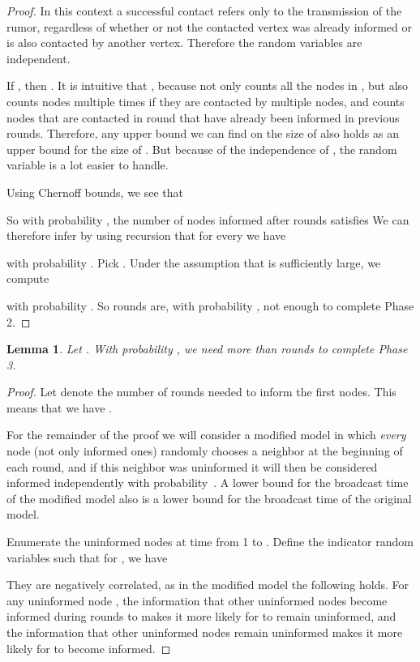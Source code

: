 \documentclass[12pt]{article}
\newtheorem{lemma}[theorem]{Lemma}
\begin{document}
{\begin{proof}
In this context a successful contact refers only to the transmission of the rumor, regardless of whether or not the contacted vertex was already informed or is also contacted by another vertex. 
Therefore the random variables  are independent.

If , then . 
It is intuitive that , because  not only counts all the nodes in , but also counts nodes multiple times if they are contacted by multiple nodes, and counts nodes that are contacted in round  that have already been informed in  previous rounds. 
Therefore, any upper bound we can find on the size of  also holds as an upper bound for the size of . 
But because of the independence of , the random variable  is a lot easier to handle.


Using Chernoff bounds, we see that


So with probability , the number of nodes informed after  rounds satisfies  We can therefore infer by using recursion that for every  we have


with probability .
Pick . Under the assumption that  is sufficiently large, we compute


with probability .
So  rounds are, with probability , not enough to complete Phase 2.
\end{proof}


\begin{lemma}\label{RandomPhase3}
Let . With probability , we need more than  rounds to complete Phase 3.
\end{lemma}
\begin{proof}
Let  denote the number of rounds needed to inform the first  nodes. 
This means that we have .

For the remainder of the proof we will consider a modified model in which \emph{every} node (not only informed ones) randomly chooses a neighbor at the beginning of each round, and if this neighbor was uninformed it will then be considered informed independently with probability~. A lower bound for the broadcast time of the modified model also is a lower bound for the broadcast time of the original model. 

Enumerate the uninformed nodes at time  from 1 to . 
Define the indicator random variables  such that for , we have



They are negatively correlated, as in the modified model the following holds. For any uninformed node , the information that other uninformed nodes become informed during rounds  to  makes it more likely for  to remain uninformed, and the information that other uninformed nodes remain uninformed makes it more likely for  to become informed.


\end{proof}}
\end{document}
